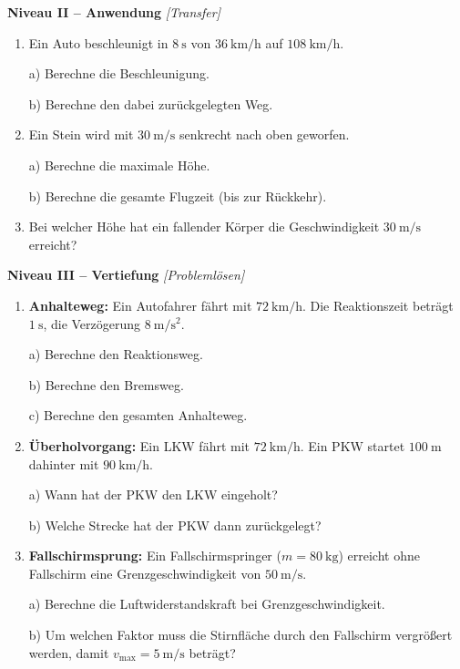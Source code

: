 \documentclass[11pt, a4paper]{article}
\begin{document}
\vspace{1em}

\textbf{Niveau II -- Anwendung} \hfill \textit{[Transfer]}

\begin{enumerate}[resume]
    \item Ein Auto beschleunigt in $\SI{8}{\second}$ von $\SI{36}{\kilo\metre\per\hour}$ auf $\SI{108}{\kilo\metre\per\hour}$.

    a) Berechne die Beschleunigung.

    b) Berechne den dabei zurückgelegten Weg.

    \item Ein Stein wird mit $\SI{30}{\metre\per\second}$ senkrecht nach oben geworfen.

    a) Berechne die maximale Höhe.

    b) Berechne die gesamte Flugzeit (bis zur Rückkehr).

    \item Bei welcher Höhe hat ein fallender Körper die Geschwindigkeit $\SI{30}{\metre\per\second}$ erreicht?
\end{enumerate}

\vspace{1em}

\textbf{Niveau III -- Vertiefung} \hfill \textit{[Problemlösen]}

\begin{enumerate}[resume]
    \item \textbf{Anhalteweg:} Ein Autofahrer fährt mit $\SI{72}{\kilo\metre\per\hour}$. Die Reaktionszeit beträgt $\SI{1}{\second}$, die Verzögerung $\SI{8}{\metre\per\second\squared}$.

    a) Berechne den Reaktionsweg.

    b) Berechne den Bremsweg.

    c) Berechne den gesamten Anhalteweg.

    \item \textbf{Überholvorgang:} Ein LKW fährt mit $\SI{72}{\kilo\metre\per\hour}$. Ein PKW startet $\SI{100}{\metre}$ dahinter mit $\SI{90}{\kilo\metre\per\hour}$.

    a) Wann hat der PKW den LKW eingeholt?

    b) Welche Strecke hat der PKW dann zurückgelegt?

    \item \textbf{Fallschirmsprung:} Ein Fallschirmspringer ($m = \SI{80}{\kilo\gram}$) erreicht ohne Fallschirm eine Grenzgeschwindigkeit von $\SI{50}{\metre\per\second}$.

    a) Berechne die Luftwiderstandskraft bei Grenzgeschwindigkeit.

    b) Um welchen Faktor muss die Stirnfläche durch den Fallschirm vergrößert werden, damit $v_{\text{max}} = \SI{5}{\metre\per\second}$ beträgt?
\end{enumerate}
\end{document}
